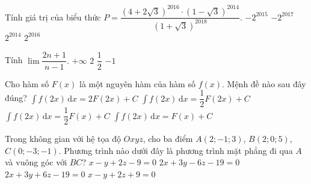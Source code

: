 \begin{ex}%
Tính giá trị của biểu thức $P=\dfrac{(4+2\sqrt{3})^{2016}\cdot (1-\sqrt{3})^{2014}}{(1+\sqrt{3})^{2018}}.$	
\choice
{$-2^{2015}$}
{$-2^{2017}$}
{\True $2^{2014}$}
{$2^{2016}$}

\end{ex} 
 
\begin{ex}%
Tính $\lim \dfrac{2n+1}{n-1}.$
\choice
{$+\infty$}
{\True $2$}
{$\dfrac{1}{2}$}
{$-1$}

\end{ex} 
 
\begin{ex}%
Cho hàm số $F(x)$ là một nguyên hàm của hàm số $f(x)$. Mệnh đề nào sau đây đúng?
\choice
{$\displaystyle\int f(2x) \mathrm{\,d}x=2F(2x)+C$}
{\True $\displaystyle\int f(2x) \mathrm{\,d}x=\dfrac{1}{2}F(2x)+C$}
{$\displaystyle\int f(2x) \mathrm{\,d}x=\dfrac{1}{2}F(x)+C$}
{$\displaystyle\int f(2x) \mathrm{\,d}x=F(x)+C$}

\end{ex} 
 
\begin{ex}%
Trong không gian với hệ tọa độ $Oxyz$, cho ba điểm $A(2;-1;3)$, $B(2;0;5)$, $C(0;-3;-1).$ Phương trình nào dưới đây là phương trình mặt phẳng đi qua $A$ và vuông góc với $BC$?
\choice
{$x-y+2z-9=0$}
{$2x+3y-6z-19=0$}
{\True $2x+3y+6z-19=0$}
{$x-y+2z+9=0$}

\end{ex} 
 
